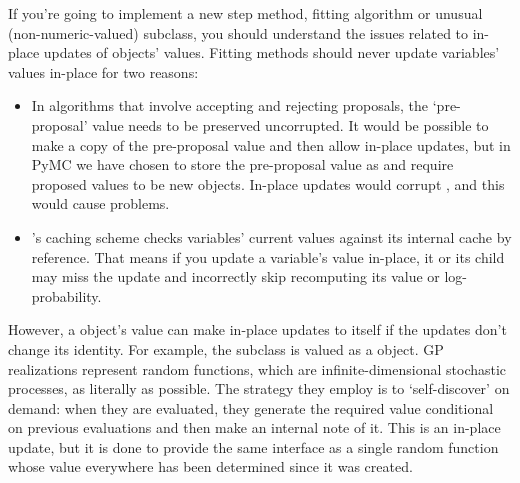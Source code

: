 If you're going to implement a new step method, fitting algorithm or unusual (non-numeric-valued)  subclass, you should understand the issues related to in-place updates of  objects' values. Fitting methods should never update variables' values in-place for two reasons:
\begin{itemize}
   \item In algorithms that involve accepting and rejecting proposals, the `pre-proposal' value needs to be preserved uncorrupted. It would be possible to make a copy of the pre-proposal value and then allow in-place updates, but in PyMC we have chosen to store the pre-proposal value as  and require proposed values to be new objects. In-place updates would corrupt , and this would cause problems.
   \item {}'s caching scheme checks variables' current values against its internal cache by reference. That means if you update a variable's value in-place, it or its child may miss the update and incorrectly skip recomputing its value or log-probability.
\end{itemize}

However, a  object's value can make in-place updates to itself if the updates don't change its identity. For example, the  subclass  is valued as a  object. GP realizations represent random functions, which are infinite-dimensional stochastic processes, as literally as possible. The strategy they employ is to `self-discover' on demand: when they are evaluated, they generate the required value conditional on previous evaluations and then make an internal note of it. This is an in-place update, but it is done to provide the same interface as a single random function whose value everywhere has been determined since it was created.
